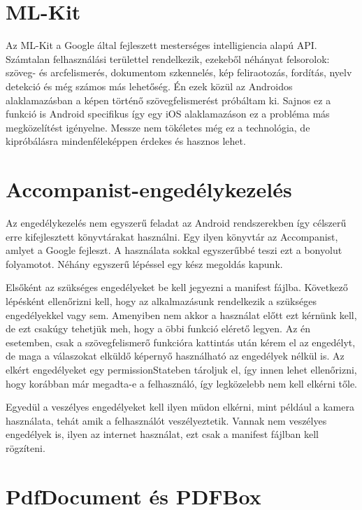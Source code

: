 \section{ML-Kit}
\label{sec:MLKit}

Az ML-Kit a Google által fejleszett mesterséges intelligiencia alapú API.
Számtalan felhasználási területtel rendelkezik, ezekeből néhányat felsorolok: szöveg- és arcfelismerés, dokumentom szkennelés, kép feliraotozás, fordítás, nyelv detekció és még számos más lehetőség.
Én ezek közül az Androidos alaklamazásban a képen történő szövegfelismerést próbáltam ki.\cite{MLKit}
Sajnos ez a funkció is Android specifikus így egy iOS alaklamazáson ez a probléma más megközelítést igényelne.
Messze nem tökéletes még ez a technológia, de kipróbálásra mindenféleképpen érdekes és hasznos lehet.

\section{Accompanist-engedélykezelés}

Az engedélykezelés nem egyszerű feladat az Android rendszerekben így célszerű erre kifejlesztett könyvtárakat használni.
Egy ilyen könyvtár az Accompanist, amlyet a Google fejleszt.
A használata sokkal egyszerűbbé teszi ezt a bonyolut folyamotot.
Néhány egyszerű lépéssel egy kész megoldás kapunk.

Elsőként az szükséges engedélyeket be kell jegyezni a manifest fájlba.
Következő lépésként ellenőrizni kell, hogy az alkalmazásunk rendelkezik a szükséges engedélyekkel vagy sem.
Amenyiben nem akkor a használat előtt ezt kérnünk kell, de ezt csakúgy tehetjük meh, hogy a öbbi funkció elérető legyen.
Az én esetemben, csak a szövegfelismerő funkcióra kattintás után kérem el az engedélyt, de maga a válaszokat elküldő képernyő használható az engedélyek nélkül is.
Az elkért engedélyeket egy permissionStateben tároljuk el, így innen lehet ellenőrizni, hogy korábban már megadta-e a felhasználó, így legközelebb nem kell elkérni tőle. \cite{Permissions}

Egyedül a veszélyes engedélyeket kell ilyen müdon elkérni, mint például a kamera használata, tehát amik a felhasználót veszélyeztetik.
Vannak nem veszélyes engedélyek is, ilyen az internet használat, ezt csak a manifest fájlban kell rögzíteni.

\section{PdfDocument és PDFBox}

